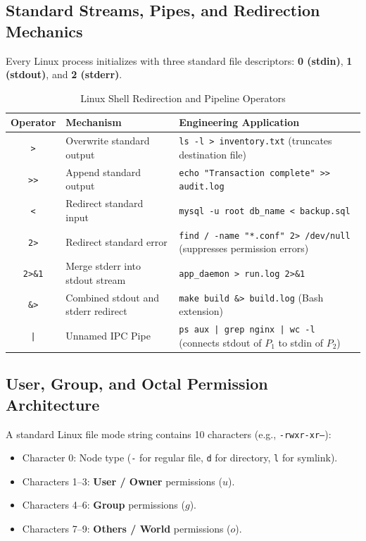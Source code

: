 \subsection{Standard Streams, Pipes, and Redirection Mechanics}
Every Linux process initializes with three standard file descriptors: \textbf{0 (stdin)}, \textbf{1 (stdout)}, and \textbf{2 (stderr)}.
\begin{table}[htbp]
\centering
\small
\caption{Linux Shell Redirection and Pipeline Operators}
\label{tab:linux_redirection}
\begin{tabularx}{\textwidth}{c p{3.5cm} X}
\toprule
\textbf{Operator} & \textbf{Mechanism} & \textbf{Engineering Application} \\
\midrule
\texttt{>} & Overwrite standard output & \texttt{ls -l > inventory.txt} (truncates destination file) \\
\texttt{>>} & Append standard output & \texttt{echo "Transaction complete" >> audit.log} \\
\texttt{<} & Redirect standard input & \texttt{mysql -u root db\_name < backup.sql} \\
\texttt{2>} & Redirect standard error & \texttt{find / -name "*.conf" 2> /dev/null} (suppresses permission errors) \\
\texttt{2>\&1} & Merge stderr into stdout stream & \texttt{app\_daemon > run.log 2>\&1} \\
\texttt{\&>} & Combined stdout and stderr redirect & \texttt{make build \&> build.log} (Bash extension) \\
\texttt{|} & Unnamed IPC Pipe & \texttt{ps aux | grep nginx | wc -l} (connects stdout of $P_1$ to stdin of $P_2$) \\
\bottomrule
\end{tabularx}
\end{table}

\subsection{User, Group, and Octal Permission Architecture}
A standard Linux file mode string contains 10 characters (e.g., \texttt{-rwxr-xr--}):
\begin{itemize}
    \item Character 0: Node type (\texttt{-} for regular file, \texttt{d} for directory, \texttt{l} for symlink).
    \item Characters 1--3: \textbf{User / Owner} permissions ($u$).
    \item Characters 4--6: \textbf{Group} permissions ($g$).
    \item Characters 7--9: \textbf{Others / World} permissions ($o$).
\end{itemize}

